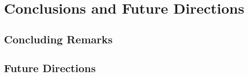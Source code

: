 \chapter{Conclusions and Future Directions}

\section{Concluding Remarks}


\section{Future Directions}

